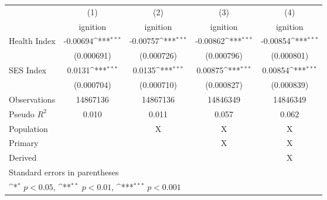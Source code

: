 {
\def\sym#1{\ifmmode^{#1}\else\(^{#1}\)\fi}
\begin{tabular}{l*{4}{c}}
\hline\hline
                    &\multicolumn{1}{c}{(1)}         &\multicolumn{1}{c}{(2)}         &\multicolumn{1}{c}{(3)}         &\multicolumn{1}{c}{(4)}         \\
                    &    ignition         &    ignition         &    ignition         &    ignition         \\
\hline
Health Index        &    -0.00694\sym{***}&    -0.00757\sym{***}&    -0.00862\sym{***}&    -0.00854\sym{***}\\
                    &  (0.000691)         &  (0.000726)         &  (0.000796)         &  (0.000801)         \\
[1em]
SES Index           &      0.0131\sym{***}&      0.0135\sym{***}&     0.00875\sym{***}&     0.00854\sym{***}\\
                    &  (0.000704)         &  (0.000710)         &  (0.000827)         &  (0.000839)         \\
\hline
Observations        &    14867136         &    14867136         &    14846349         &    14846349         \\
Pseudo \(R^{2}\)    &       0.010         &       0.011         &       0.057         &       0.062         \\
Population          &                     &           X         &           X         &           X         \\
Primary             &                     &                     &           X         &           X         \\
Derived             &                     &                     &                     &           X         \\
\hline\hline
\multicolumn{5}{l}{\footnotesize Standard errors in parentheses}\\
\multicolumn{5}{l}{\footnotesize \sym{*} \(p<0.05\), \sym{**} \(p<0.01\), \sym{***} \(p<0.001\)}\\
\end{tabular}
}
